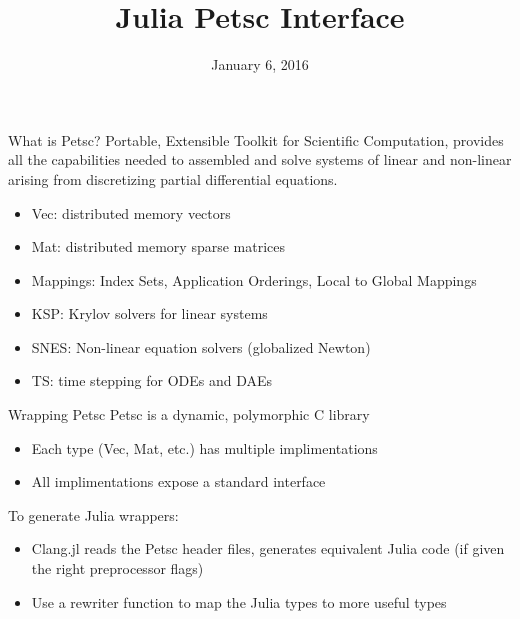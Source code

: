 \documentclass{beamer}
\title{Julia Petsc Interface}
\date{January 6, 2016}
\begin{document}
\begin{frame}
\titlepage
\end{frame}

\begin{frame}{What is Petsc?}
Portable, Extensible Toolkit for Scientific Computation, provides all the 
capabilities needed to assembled and solve systems of linear and non-linear 
arising from discretizing partial differential equations.
\begin{itemize}
  \item Vec: distributed memory vectors
  \item Mat: distributed memory sparse matrices
  \item Mappings: Index Sets, Application Orderings, Local to Global Mappings
  \item KSP: Krylov solvers for linear systems
  \item SNES: Non-linear equation solvers (globalized Newton)
  \item TS: time stepping for ODEs and DAEs
\end{itemize}
\end{frame}


\begin{frame}{Wrapping Petsc}
Petsc is a dynamic, polymorphic C library 
\begin{itemize}
  \item Each type (Vec, Mat, etc.) has multiple implimentations
  \item All implimentations expose a standard interface
\end{itemize}
\hfill

To generate Julia wrappers:
\begin{itemize}
  \item Clang.jl reads the Petsc header files, generates equivalent Julia code (if given the right preprocessor flags)
  \item Use a rewriter function to map the Julia types to more useful types
\end{itemize}

\end{frame}
\end{document}
